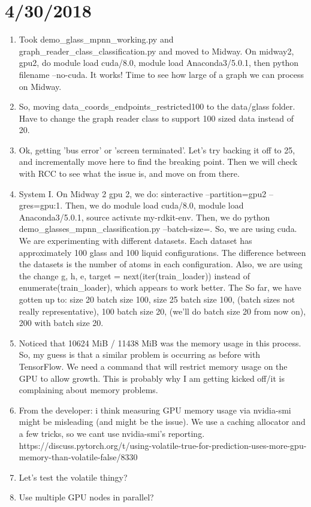 \documentclass[12pt,reqno]{amsart}
\numberwithin{equation}{section}
\begin{document}
\section{4/30/2018}

\begin{enumerate}
\item Took demo\_glass\_mpnn\_working.py and graph\_reader\_class\_classification.py and moved to Midway.  On midway2, gpu2, do module load cuda/8.0, module load Anaconda3/5.0.1, then python filename --no-cuda.  It works!  Time to see how large of a graph we can process on Midway.  
\item So, moving data\_coords\_endpoints\_restricted100 to the data/glass folder.  Have to change the graph reader class to support 100 sized data instead of 20.  
\item Ok, getting 'bus error' or 'screen terminated'.  Let's try backing it off to 25, and incrementally move here to find the breaking point.  Then we will check with RCC to see what the issue is, and move on from there.  
\item System I.  On Midway 2 gpu 2, we do: sinteractive --partition=gpu2 --gres=gpu:1.  Then, we do module load cuda/8.0, module load Anaconda3/5.0.1, source activate my-rdkit-env.  Then, we do python demo\_glasses\_mpnn\_classification.py --batch-size=.   So, we are using cuda.  We are experimenting with different datasets.  Each dataset has approximately 100 glass and 100 liquid configurations.  The difference between the datasets is the number of atoms in each configuration.  Also, we are using the change g, h, e, target = next(iter(train\_loader)) instead of enumerate(train\_loader), which appears to work better.  The So far, we have gotten up to: size 20 batch size 100, size 25 batch size 100, (batch sizes not really representative), 100 batch size 20, (we'll do batch size 20 from now on), 200 with batch size 20.  
\item Noticed that 10624 MiB / 11438 MiB was the memory usage in this process.  So, my guess is that a similar problem is occurring as before with TensorFlow.  We need a command that will restrict memory usage on the GPU to allow growth.  This is probably why I am getting kicked off/it is complaining about memory problems.  
\item From the developer: i think measuring GPU memory usage via nvidia-smi might be misleading (and might be the issue). We use a caching allocator and a few tricks, so we cant use nvidia-smi's reporting. https://discuss.pytorch.org/t/using-volatile-true-for-prediction-uses-more-gpu-memory-than-volatile-false/8330
\item Let's test the volatile thingy?  
\item Use multiple GPU nodes in parallel?
\end{enumerate}
\end{document}
